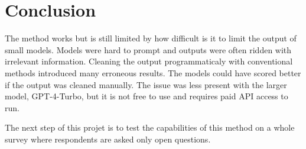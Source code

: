 \documentclass[
  authoryear,
  preprint,
  3p]{elsarticle}
\begin{document}
\section{Conclusion}\label{conclusion}

The method works but is still limited by how difficult is it to limit
the output of small models. Models were hard to prompt and outputs were
often ridden with irrelevant information. Cleaning the output
programmaticaly with conventional methods introduced many erroneous
results. The models could have scored better if the output was cleaned
manually. The issue was less present with the larger model, GPT-4-Turbo,
but it is not free to use and requires paid API access to run.

The next step of this projet is to test the capabilities of this method
on a whole survey where respondents are asked only open questions.

\newpage{}


\renewcommand\refname{References}
  
\end{document}
